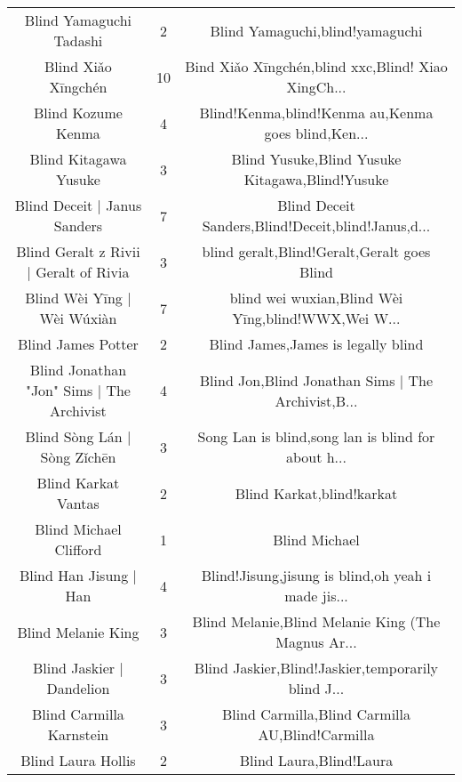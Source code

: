 \begin{table}[h!]
{\begin{tabular}{|c|c|c|}
                           Blind Yamaguchi Tadashi &      2 &                    Blind Yamaguchi,blind!yamaguchi \\
                               Blind Xiǎo Xīngchén &     10 & Bind Xiǎo Xīngchén,blind xxc,Blind! Xiao XingCh... \\
                                Blind Kozume Kenma &      4 & Blind!Kenma,blind!Kenma au,Kenma goes blind,Ken... \\
                             Blind Kitagawa Yusuke &      3 &    Blind Yusuke,Blind Yusuke Kitagawa,Blind!Yusuke \\
                      Blind Deceit | Janus Sanders &      7 & Blind Deceit Sanders,Blind!Deceit,blind!Janus,d... \\
            Blind Geralt z Rivii | Geralt of Rivia &      3 &        blind geralt,Blind!Geralt,Geralt goes Blind \\
                       Blind Wèi Yīng | Wèi Wúxiàn &      7 & blind wei wuxian,Blind Wèi Yīng,blind!WWX,Wei W... \\
                                Blind James Potter &      2 &                 Blind James,James is legally blind \\
         Blind Jonathan "Jon" Sims | The Archivist &      4 & Blind Jon,Blind Jonathan Sims | The Archivist,B... \\
                      Blind Sòng Lán | Sòng Zǐchēn &      3 & Song Lan is blind,song lan is blind for about h... \\
                               Blind Karkat Vantas &      2 &                          Blind Karkat,blind!karkat \\
                            Blind Michael Clifford &      1 &                                      Blind Michael \\
                            Blind Han Jisung | Han &      4 & Blind!Jisung,jisung is blind,oh yeah i made jis... \\
                                Blind Melanie King &      3 & Blind Melanie,Blind Melanie King (The Magnus Ar... \\
                         Blind Jaskier | Dandelion &      3 & Blind Jaskier,Blind!Jaskier,temporarily blind J... \\
                          Blind Carmilla Karnstein &      3 &    Blind Carmilla,Blind Carmilla AU,Blind!Carmilla \\
                                Blind Laura Hollis &      2 &                            Blind Laura,Blind!Laura \\

\end{tabular}}
\end{table}
